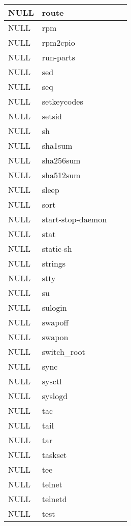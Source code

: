 \begin{longtable}{llp{60mm}p{60mm}}
     \hline
      NULL& route \\
     \hline
      NULL& rpm \\
     \hline
      NULL& rpm2cpio \\
     \hline
      NULL& run-parts \\
     \hline
      NULL& sed \\
     \hline
      NULL& seq \\
     \hline
      NULL& setkeycodes \\
     \hline
      NULL& setsid \\
     \hline
      NULL& sh \\
     \hline
      NULL& sha1sum \\
     \hline
      NULL& sha256sum \\
     \hline
      NULL& sha512sum \\
     \hline
      NULL& sleep \\
     \hline
      NULL& sort \\
     \hline
      NULL& start-stop-daemon \\
     \hline
      NULL& stat \\
     \hline
      NULL& static-sh \\
     \hline
      NULL& strings \\
     \hline
      NULL& stty \\
     \hline
      NULL& su \\
     \hline
      NULL& sulogin \\
     \hline
      NULL& swapoff \\
     \hline
      NULL& swapon \\
     \hline
      NULL& switch\_root \\
     \hline
      NULL& sync \\
     \hline
      NULL& sysctl \\
     \hline
      NULL& syslogd \\
     \hline
      NULL& tac \\
     \hline
      NULL& tail \\
     \hline
      NULL& tar \\
     \hline
      NULL& taskset \\
     \hline
      NULL& tee \\
     \hline
      NULL& telnet \\
     \hline
      NULL& telnetd \\
     \hline
      NULL& test \\
     \hline

\end{longtable}
